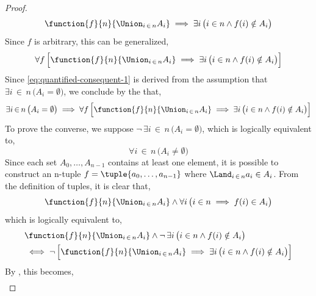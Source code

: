 \begin{proof}
\begin{equation*}
        \function{f}{n}{\Union_{i \,\in\, n} A_{i}} \implies \exists i \, \big( i \in n \land f(i) \notin A_{i} \big)
    \end{equation*}
    Since \( f \) is arbitrary, this can be generalized,
    \begin{equation}
        \label{eq:quantified-consequent-1}
        \forall f \, \Big[ \function{f}{n}{\Union_{i \,\in\, n} A_{i}} \implies \exists i \, \big( i \in n \land f(i) \notin A_{i} \big) \Big]
    \end{equation}
    Since \eqref{eq:quantified-consequent-1} is derived from the assumption that \( \exists i\,{\in}\,n \, \big( A_{i} = \emptyset \big) \),
    we conclude by the  that,
    \begin{equation}
        \label{eq:at-least-one-empty-Ai-implies-empty-product}
        \exists i\,{\in}\,n \, \big( A_{i} = \emptyset \big) \implies
        \forall f \, \Big[ \function{f}{n}{\Union_{i \,\in\, n} A_{i}} \implies \exists i \, \big( i \in n \land f(i) \notin A_{i} \big) \Big]
    \end{equation}
    To prove the converse, we suppose \( \lnot \, \exists i\,{\in}\,n \, \big( A_{i} = \emptyset \big) \), which is logically equivalent to,
    \begin{equation*}
        \forall i\,{\in}\,n \, \big( A_{i} \neq \emptyset \big)
    \end{equation*}
    Since each set \( A_{0},\dots,A_{n-1} \) contains at least one element,
    it is possible to construct an n-tuple \( f = \tuple{a_{0}, \dots, a_{n-1}} \) where \( \Land_{i \,\in\, n} a_{i} \in A_{i} \).
    From the definition of tuples, it is clear that,
    \begin{equation*}
        \function{f}{n}{\Union_{i \,\in\, n} A_{i}} \land \forall i \, \big( i \in n \implies f(i) \in A_{i} \big)
    \end{equation*}
    which is logically equivalent to,
    \begin{align*}
        &\function{f}{n}{\Union_{i \,\in\, n} A_{i}} \land \lnot \, \exists i \, \big( i \in n \land f(i) \notin A_{i} \big) \\
        &\iff
        \lnot \, \Big[ \function{f}{n}{\Union_{i \,\in\, n} A_{i}} \implies \exists i \, \big( i \in n \land f(i) \notin A_{i} \big) \Big]
    \end{align*}
    By , this becomes,
    \begin{align}

\end{align}
\end{proof}
